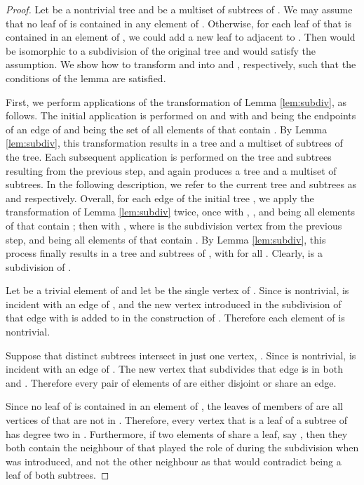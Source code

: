 \documentclass[
final
]{dmtcs-episciences}        \usepackage{graphics, amsthm, amsmath, amssymb, algorithm, algorithmic}
\begin{document}
\begin{proof}
Let  be a nontrivial tree and  be a multiset of subtrees of .
We may assume that no leaf of  is contained in any element of . Otherwise, for each leaf  of  that is contained in an element of , we could add a new leaf to  adjacent to . Then  would be isomorphic to a subdivision of the original tree and would satisfy the assumption. 
We show how to transform  and  into  and , respectively,  such that the conditions of the lemma are satisfied.


First, 
we perform  applications of the transformation of Lemma \ref{lem:subdiv}, as follows.
The initial application is performed on  and  
with  and  being the endpoints of an edge of  and  being the set of all elements of  that contain . By Lemma \ref{lem:subdiv}, this transformation
results in a tree and a multiset of subtrees of the tree. Each subsequent application is performed on the tree and subtrees resulting from the previous step, and again produces a tree and a multiset of subtrees. In the following description, we refer to the current tree and subtrees as  and  respectively.
Overall,
for each edge  of the initial tree , we apply the transformation of Lemma \ref{lem:subdiv} twice, once with , , and  being all elements of  that contain ;
then with ,  where  is the subdivision vertex from the previous step, and
 being all elements of  that contain .
By Lemma \ref{lem:subdiv}, this process finally results in a tree  and
subtrees  of , with
 for all .
Clearly,  is a subdivision of .



Let  be a trivial element of  and let  be the single vertex of . Since  is nontrivial,  is incident with an edge of , and the new vertex introduced in the subdivision of that edge with  is added to  in the construction of .
Therefore each element of  is nontrivial.

Suppose that distinct subtrees  intersect in just one vertex, . 
Since  is nontrivial,  is incident with an edge of . The new vertex that subdivides that edge is in both  and . Therefore every pair of elements of  are either disjoint or share an edge.

Since no leaf of  is contained in an element of ,
the leaves of members of 
are all vertices of  that are not in .
Therefore, every vertex that is a leaf of a subtree of 
 has degree two in .
Furthermore, if two elements of  share a leaf, say , then they both contain the neighbour of  that played the role of  during the subdivision when  was introduced, and not the other neighbour as that would contradict  being a leaf of both subtrees.


\end{proof}
\end{document}
